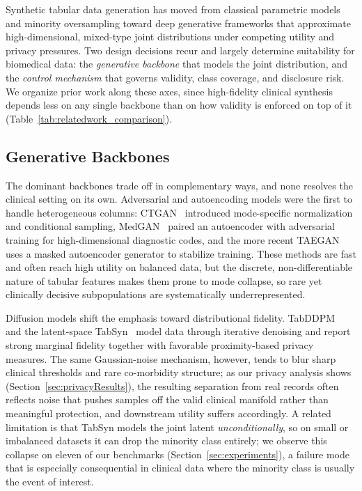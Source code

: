 Synthetic tabular data generation has moved from classical parametric models and minority oversampling toward deep generative frameworks that approximate high-dimensional, mixed-type joint distributions under competing utility and privacy pressures. Two design decisions recur and largely determine suitability for biomedical data: the \emph{generative backbone} that models the joint distribution, and the \emph{control mechanism} that governs validity, class coverage, and disclosure risk. We organize prior work along these axes, since high-fidelity clinical synthesis depends less on any single backbone than on how validity is enforced on top of it (Table~\ref{tab:relatedwork_comparison}).

\subsection{Generative Backbones}
The dominant backbones trade off in complementary ways, and none resolves the clinical setting on its own. Adversarial and autoencoding models were the first to handle heterogeneous columns: CTGAN~\cite{xu2019modeling} introduced mode-specific normalization and conditional sampling, MedGAN~\cite{choi2017generating} paired an autoencoder with adversarial training for high-dimensional diagnostic codes, and the more recent TAEGAN~\cite{li2025taegangeneratingsynthetictabular} uses a masked autoencoder generator to stabilize training. These methods are fast and often reach high utility on balanced data, but the discrete, non-differentiable nature of tabular features makes them prone to mode collapse, so rare yet clinically decisive subpopulations are systematically underrepresented.

Diffusion models shift the emphasis toward distributional fidelity. TabDDPM~\cite{kotelnikov2023tabddpm} and the latent-space TabSyn~\cite{tabsyn} model data through iterative denoising and report strong marginal fidelity together with favorable proximity-based privacy measures. The same Gaussian-noise mechanism, however, tends to blur sharp clinical thresholds and rare co-morbidity structure; as our privacy analysis shows (Section~\ref{sec:privacyResults}), the resulting separation from real records often reflects noise that pushes samples off the valid clinical manifold rather than meaningful protection, and downstream utility suffers accordingly. A related limitation is that TabSyn models the joint latent \emph{unconditionally}, so on small or imbalanced datasets it can drop the minority class entirely; we observe this collapse on eleven of our benchmarks (Section~\ref{sec:experiments}), a failure mode that is especially consequential in clinical data where the minority class is usually the event of interest.

